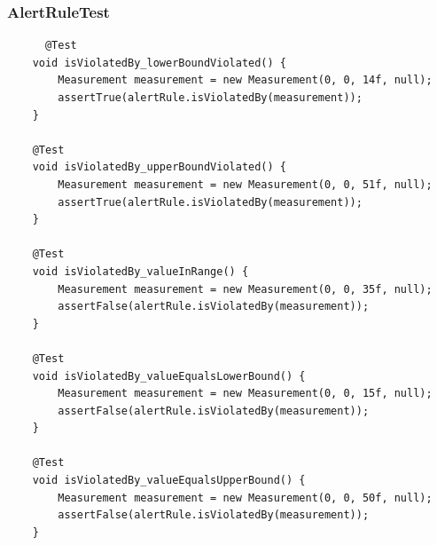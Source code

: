 \documentclass[a4paper, 11pt]{article}
\begin{document}
	\subsubsection{AlertRuleTest}
	\begin{lstlisting}
      @Test
    void isViolatedBy_lowerBoundViolated() {
        Measurement measurement = new Measurement(0, 0, 14f, null);
        assertTrue(alertRule.isViolatedBy(measurement));
    }

    @Test
    void isViolatedBy_upperBoundViolated() {
        Measurement measurement = new Measurement(0, 0, 51f, null);
        assertTrue(alertRule.isViolatedBy(measurement));
    }

    @Test
    void isViolatedBy_valueInRange() {
        Measurement measurement = new Measurement(0, 0, 35f, null);
        assertFalse(alertRule.isViolatedBy(measurement));
    }

    @Test
    void isViolatedBy_valueEqualsLowerBound() {
        Measurement measurement = new Measurement(0, 0, 15f, null);
        assertFalse(alertRule.isViolatedBy(measurement));
    }

    @Test
    void isViolatedBy_valueEqualsUpperBound() {
        Measurement measurement = new Measurement(0, 0, 50f, null);
        assertFalse(alertRule.isViolatedBy(measurement));
    }
	\end{lstlisting}
\end{document}

